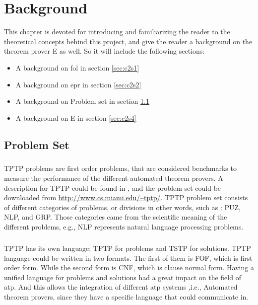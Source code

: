 \chapter{Background}\label{chap:background}


This chapter is devoted for introducing and familiarizing the reader to the theoretical concepts behind this project, and give the reader a background on the theorem prover E as well. So it will include the following sections:
	\begin{itemize}
		\item A background on \acf{fol} in section \ref{sec:c2s1} %
		\item A background on \acf{epr} in section \ref{sec:c2s2} %
		\item A background on Problem set in section \ref{sec:c2s3} %
		\item A background on E in section \ref{sec:c2s4} %
	\end{itemize}






\section{Problem Set}\label{sec:c2s3}

\paragraph{}
TPTP problems are first order problems, that are considered benchmarks to measure the performance of the different automated theorem provers. A description for TPTP could be found in \cite{TPTP09}, and the problem set could be downloaded from \url{http://www.cs.miami.edu/~tptp/}. TPTP problem set consists of different categories of problems, or divisions in other words, such as : PUZ, NLP, and GRP. Those categories came from the scientific meaning of the different problems, e.g., NLP represents natural language processing problems.

\paragraph{}
TPTP has its own language; TPTP for problems and TSTP for solutions. TPTP language could be written in two formats. The first of them is FOF, which is first order form. While the second form is CNF, which is clause normal form. Having a unified language for problems and solutions had a great impact on the field of \ac{atp}. And this allows the integration of different \ac{atp} systems ,i.e., Automated theorem provers, since they have a specific language that could communicate in.  

